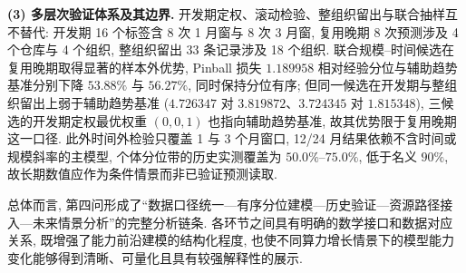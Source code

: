 \textbf{(3) 多层次验证体系及其边界.} 开发期定权、滚动检验、整组织留出与联合抽样互不替代:
开发期 16 个标签含 8 次 1 月窗与 8 次 3 月窗, 复用晚期 8 次预测涉及 4 个仓库与 4 个组织, 整组织留出 33 条记录涉及 18 个组织. 联合规模--时间候选在复用晚期取得显著的样本外优势, Pinball 损失 $1.189958$ 相对经验分位与辅助趋势基准分别下降 $53.88\%$ 与 $56.27\%$, 同时保持分位有序; 但同一候选在开发期与整组织留出上弱于辅助趋势基准 ($4.726347$ 对 $3.819872$、$3.724345$ 对 $1.815348$), 三候选的开发期定权最优权重 $(0,0,1)$ 也指向辅助趋势基准, 故其优势限于复用晚期这一口径. 此外时间外检验只覆盖 1 与 3 个月窗口, 12/24 月结果依赖不含时间或规模斜率的主模型, 个体分位带的历史实测覆盖为 $50.0\%$--$75.0\%$, 低于名义 $90\%$, 故长期数值应作为条件情景而非已验证预测读取.

总体而言, 第四问形成了“数据口径统一—有序分位建模—历史验证—资源路径接入—未来情景分析”的完整分析链条. 各环节之间具有明确的数学接口和数据对应关系, 既增强了能力前沿建模的结构化程度, 也使不同算力增长情景下的模型能力变化能够得到清晰、可量化且具有较强解释性的展示.
